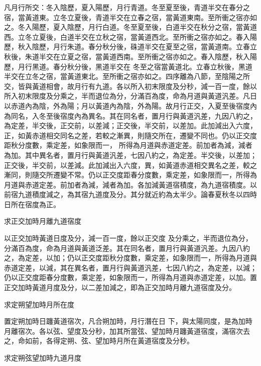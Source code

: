 \begin{pinyinscope}
 凡月行所交：冬入陰歷，夏入陽歷，月行青道。冬至夏至後，青道半交在春分之宿，當黃道東。立冬立夏後，青道半交在立春之宿，當黃道東南。至所衝之宿亦如之。冬入陽歷，夏入陰歷，月行白道。冬至夏至後，白道半交在秋分之宿，當黃道西。立冬立夏後，白道半交在立秋之宿，當黃道西北。至所衝之宿亦如之。春入陽歷，秋入陰歷，月行朱道。春分秋分後，硃道半交在夏至之宿，當黃道南。立春立秋後，朱道半交在立夏之宿，當黃道西南。至所衝之宿亦如之。春入陰歷，秋入陽歷，月行黑道。春分秋分後，黑道半交在
 冬至之宿當黃道北。立春立秋後，黑道半交在立冬之宿，當黃道東北。至所衝之宿亦如之。四序離為八節，至陰陽之所交，皆與黃道相會，故月行有九道。各以所入初末限度及分秒，減一百一度，餘以所入初末限度及分乘之，半而退位為分，分滿百為度，命為月道與黃道汎差。凡日以赤道內為陰，外為陽；月以黃道內為陰，外為陽。故月行正交，入夏至後宿度內為同名，入冬至後宿度內為異名。其在同名者，置月行與黃道汎差，九因八約之，為定差，半交後，正交前，以差減；正交後，半交前，以差加。此加減出入六度，正，如黃赤道相交同名之差，若較之漸異，則隨交所在，遷變不同也。仍以正交度距秋分度數，乘定差，如象限而一，
 所得為月道與赤道定差。前加者為減，減者為加。其中異名者，置月行與黃道汎差，七因八約之，為定差。半交後，以差加；正交後，半交前，以差減。此加減出入六度，異，如黃道赤道相交異名之差，較之漸同，則隨交所遷變不常。仍以正交度距春分度數，乘定差，如象限而一，所得為月道與赤道定差。前加者為減，減者為加。各加減黃道宿積度，為九道宿積度。以前宿九道積度減之，為其宿九道度及分。其分就近約為太半少。論春夏秋冬以四時日所在宿度為正。



 求正交加時月離九道宿度



 以正交加時黃道日度及分，減一百一度，餘以正交度
 及分乘之，半而退位為分，分滿百為度，命為月道與黃道泛差。其在同名者，置月行與黃道汎差。九因八約之，為定差，以加；仍以正交度距秋分度數，乘定差，如象限而一，所得為月道與赤道定差，以減，其在異名者，置月行與黃道汎差，七因八約之，為定差，以減；仍以正交度距春分度數，乘定差，如象限而一，所得為月道與赤道定差，以加。置正交加時黃道月度及分，以二差加減之，即為正交加時月離九道宿度及分。



 求定朔望加時月所在度



 置定朔加時日躔黃道宿次，凡合朔加時，月行潛在日
 下，與太陽同度，是為加時月離宿次。各以弦、望度及分秒，加其所當弦、望加時月躔黃道宿度，滿宿次去之，命如前，各得定朔、弦、望加時月所在黃道宿度及分秒。



 求定朔弦望加時九道月度




\end{pinyinscope}
